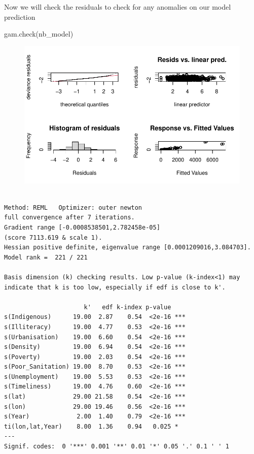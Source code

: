 \documentclass[
  letterpaper,
  DIV=11,
  numbers=noendperiod]{scrartcl}
\newenvironment{Shaded}{\begin{snugshade}}{\end{snugshade}}
\newcommand{\FunctionTok}[1]{\textcolor[rgb]{0.28,0.35,0.67}{#1}}
\newcommand{\NormalTok}[1]{\textcolor[rgb]{0.00,0.23,0.31}{#1}}
\begin{document}
Now we will check the residuals to check for any anomalies on our model
prediction

\begin{Shaded}
\begin{Highlighting}[]
\FunctionTok{gam.check}\NormalTok{(nb\_model)}
\end{Highlighting}
\end{Shaded}

\begin{figure}[H]

{\centering \includegraphics{Group34Coursework_files/figure-pdf/unnamed-chunk-13-1.pdf}

}

\end{figure}

\begin{verbatim}

Method: REML   Optimizer: outer newton
full convergence after 7 iterations.
Gradient range [-0.0008538501,2.782458e-05]
(score 7113.619 & scale 1).
Hessian positive definite, eigenvalue range [0.0001209016,3.084703].
Model rank =  221 / 221 

Basis dimension (k) checking results. Low p-value (k-index<1) may
indicate that k is too low, especially if edf is close to k'.

                      k'   edf k-index p-value    
s(Indigenous)      19.00  2.87    0.54  <2e-16 ***
s(Illiteracy)      19.00  4.77    0.53  <2e-16 ***
s(Urbanisation)    19.00  6.60    0.54  <2e-16 ***
s(Density)         19.00  6.94    0.54  <2e-16 ***
s(Poverty)         19.00  2.03    0.54  <2e-16 ***
s(Poor_Sanitation) 19.00  8.70    0.53  <2e-16 ***
s(Unemployment)    19.00  5.53    0.53  <2e-16 ***
s(Timeliness)      19.00  4.76    0.60  <2e-16 ***
s(lat)             29.00 21.58    0.54  <2e-16 ***
s(lon)             29.00 19.46    0.56  <2e-16 ***
s(Year)             2.00  1.40    0.79  <2e-16 ***
ti(lon,lat,Year)    8.00  1.36    0.94   0.025 *  
---
Signif. codes:  0 '***' 0.001 '**' 0.01 '*' 0.05 '.' 0.1 ' ' 1
\end{verbatim}
\end{document}
